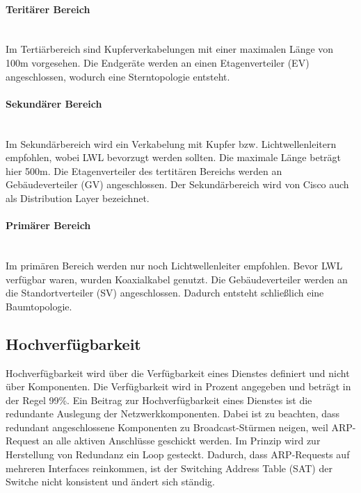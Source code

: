\paragraph{Teritärer Bereich} ~\\

Im Tertiärbereich sind Kupferverkabelungen mit einer maximalen Länge von 100m vorgesehen. Die Endgeräte werden an einen Etagenverteiler (EV) angeschlossen, wodurch eine Sterntopologie entsteht.

\paragraph{Sekundärer Bereich} ~\\

Im Sekundärbereich wird ein Verkabelung mit Kupfer bzw. Lichtwellenleitern empfohlen, wobei LWL bevorzugt werden sollten. Die maximale Länge beträgt hier 500m. Die Etagenverteiler des tertitären Bereichs werden an Gebäudeverteiler (GV) angeschlossen. Der Sekundärbereich wird von Cisco auch als Distribution Layer bezeichnet.

\paragraph{Primärer Bereich} ~\\

Im primären Bereich werden nur noch Lichtwellenleiter empfohlen. Bevor LWL verfügbar waren, wurden Koaxialkabel genutzt. Die Gebäudeverteiler werden an die Standortverteiler (SV) angeschlossen. Dadurch entsteht schließlich eine Baumtopologie.

\subsection{Hochverfügbarkeit}

Hochverfügbarkeit wird über die Verfügbarkeit eines Dienstes definiert und nicht über Komponenten. Die Verfügbarkeit wird in Prozent angegeben und beträgt in der Regel 99\%. Ein Beitrag zur Hochverfügbarkeit eines Dienstes ist die redundante Auslegung der Netzwerkkomponenten. Dabei ist zu beachten, dass redundant angeschlossene Komponenten zu Broadcast-Stürmen neigen, weil ARP-Request an alle aktiven Anschlüsse geschickt werden. Im Prinzip wird zur Herstellung von Redundanz ein Loop gesteckt. Dadurch, dass ARP-Requests auf mehreren Interfaces reinkommen, ist der Switching Address Table (SAT) der Switche nicht konsistent und ändert sich ständig.

